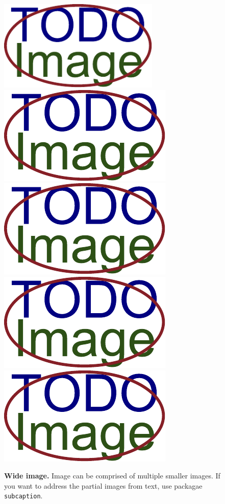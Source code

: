 \begin{figure}[h]\centering
  \centering
  \includegraphics[width=\linewidth,height=1.7in]{images/placeholder.pdf}\\[1pt]
  \includegraphics[width=0.24\linewidth]{images/placeholder.pdf}\hfill
  \includegraphics[width=0.24\linewidth]{images/placeholder.pdf}\hfill
  \includegraphics[width=0.24\linewidth]{images/placeholder.pdf}\hfill
  \includegraphics[width=0.24\linewidth]{images/placeholder.pdf}
  \caption{\textbf{Wide image.} Image can be comprised of multiple smaller images. If you want to address the partial images from text, use packagae \texttt{subcaption}.}
  \label{sirokyObrazek}
\end{figure}


